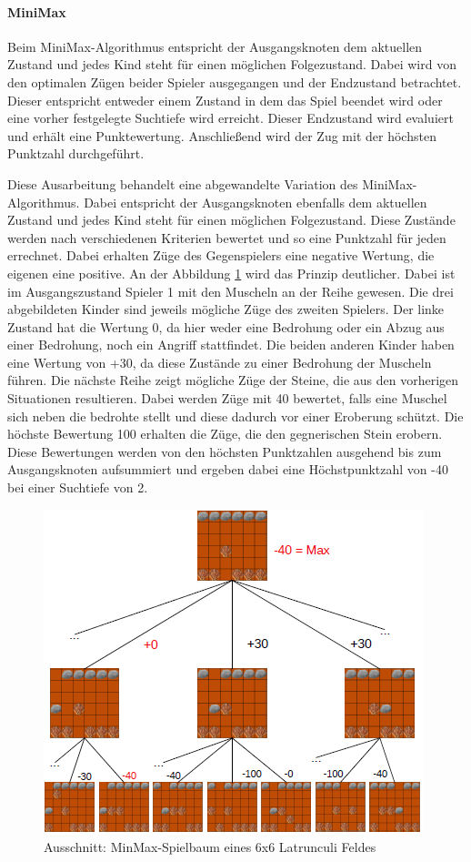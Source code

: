 \paragraph{MiniMax}
Beim MiniMax-Algorithmus entspricht der Ausgangsknoten dem aktuellen Zustand und jedes Kind steht für einen möglichen Folgezustand. Dabei wird von den optimalen Zügen beider Spieler ausgegangen und der Endzustand betrachtet. Dieser entspricht entweder einem Zustand in dem das Spiel beendet wird oder eine vorher festgelegte Suchtiefe wird erreicht. Dieser Endzustand wird evaluiert und erhält eine Punktewertung. Anschließend wird der Zug mit der höchsten Punktzahl durchgeführt. \par
Diese Ausarbeitung behandelt eine abgewandelte Variation des MiniMax-Algorithmus. Dabei entspricht der Ausgangsknoten ebenfalls dem aktuellen Zustand und jedes Kind steht für einen möglichen Folgezustand. Diese Zustände werden nach verschiedenen Kriterien bewertet und so eine Punktzahl für jeden errechnet. Dabei erhalten Züge des Gegenspielers eine negative Wertung, die eigenen eine positive. An der Abbildung \ref{fig:Spielbaum} wird das Prinzip deutlicher. Dabei ist im Ausgangszustand Spieler 1 mit den Muscheln an der Reihe gewesen. Die drei abgebildeten Kinder sind jeweils mögliche Züge des zweiten Spielers. Der linke Zustand hat die Wertung 0, da hier weder eine Bedrohung oder ein Abzug aus einer Bedrohung, noch ein Angriff stattfindet. Die beiden anderen Kinder haben eine Wertung von +30, da diese Zustände zu einer Bedrohung der Muscheln führen. Die nächste Reihe zeigt mögliche Züge der Steine, die aus den vorherigen Situationen resultieren. Dabei werden Züge mit 40 bewertet, falls eine Muschel sich neben die bedrohte stellt und diese dadurch vor einer Eroberung schützt. Die höchste Bewertung 100 erhalten die Züge, die den gegnerischen Stein erobern. Diese Bewertungen werden von den höchsten Punktzahlen ausgehend bis zum Ausgangsknoten aufsummiert und ergeben dabei eine Höchstpunktzahl von -40 bei einer Suchtiefe von 2. %
\begin{figure}[h]
	\centering
	\includegraphics{img/Spielbaum_latrun4}
	\caption{ Ausschnitt: MinMax-Spielbaum eines 6x6 Latrunculi Feldes}
	\label{fig:Spielbaum}
\end{figure}
